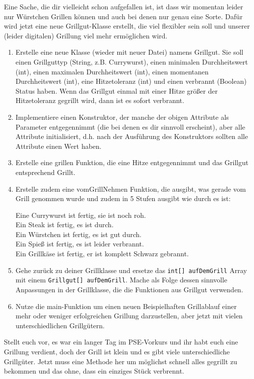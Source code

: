 \documentclass{../../sheet}
\begin{document}
\newpage
{}
Eine Sache, die dir vielleicht schon aufgefallen ist, ist dass wir momentan leider nur Würstchen Grillen können und auch bei denen nur genau eine Sorte. Dafür wird jetzt eine neue Grillgut-Klasse erstellt, die viel flexibler sein soll und unserer (leider digitalen) Grillung viel mehr ermöglichen wird.
\begin{enumerate}
    \item Erstelle eine neue Klasse (wieder mit neuer Datei) namens Grillgut. Sie soll einen Grillguttyp (String, z.B. Currywurst), einen minimalen Durchheitswert (int), einen maximalen Durchheitswert (int), einen momentanen Durchheitswert (int), eine Hitzetoleranz (int) und einen verbrannt (Boolean) Status haben. Wenn das Grillgut einmal mit einer Hitze größer der Hitzetoleranz gegrillt wird, dann ist es sofort verbrannt.
    \item Implementiere einen Konstruktor, der manche der obigen Attribute als Parameter entgegennimmt (die bei denen es dir sinnvoll erscheint), aber alle Attribute initialisiert, d.h. nach der Ausführung des Konstruktors sollten alle Attribute einen Wert haben.
    \item Erstelle eine grillen Funktion, die eine Hitze entgegennimmt und das Grillgut entsprechend Grillt. 
    \item Erstelle zudem eine vomGrillNehmen Funktion, die ausgibt, was gerade vom Grill genommen wurde und zudem in 5 Stufen ausgibt wie durch es ist:
    \begin{ausgabe}
Eine Currywurst ist fertig, sie ist noch roh.\\
Ein Steak ist fertig, es ist durch.\\
Ein Würstchen ist fertig, es ist gut durch.\\
Ein Spieß ist fertig, es ist leider verbrannt.\\
Ein Grillkäse ist fertig, er ist komplett Schwarz gebrannt.
    \end{ausgabe}
    \item Gehe zurück zu deiner Grillklasse und ersetze das \texttt{int[] aufDemGrill} Array mit einem \texttt{Grillgut[] aufDemGrill}. Mache als Folge dessen sinnvolle Anpassungen in der Grillklasse, die die Funktionen aus Grillgut verwenden.
    \item Nutze die main-Funktion um einen neuen Beispielhaften Grillablauf einer mehr oder weniger erfolgreichen
    Grillung darzustellen, aber jetzt mit vielen unterschiedlichen Grillgütern.
\end{enumerate}

\newpage
{}
Stellt euch vor, es war ein langer Tag im PSE-Vorkurs und ihr habt euch eine Grillung verdient, doch der Grill ist klein und es gibt viele unterschiedliche Grillgüter. Jetzt muss eine Methode her um möglichst schnell alles gegrillt zu bekommen und das ohne, dass ein einziges Stück verbrennt.
\end{document}
